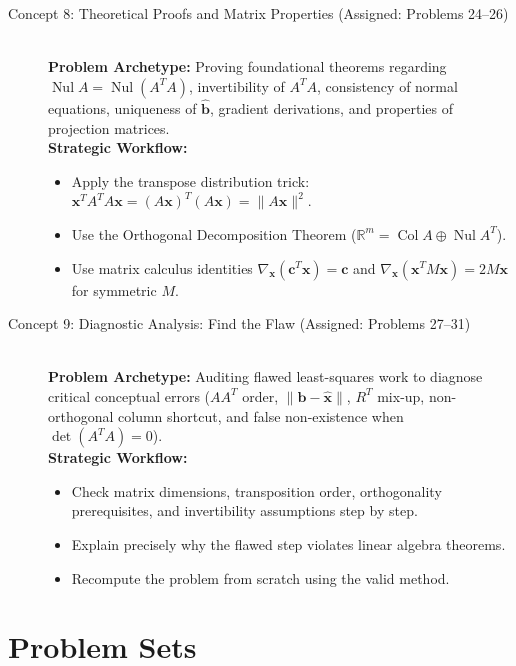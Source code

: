 \documentclass[11pt, letterpaper]{article}
\theoremstyle{definition}
\theoremstyle{remark}
\begin{document}
\begin{description}
    \item[Concept 8: Theoretical Proofs and Matrix Properties (Assigned: Problems 24--26)] \hfill \\
    \textbf{Problem Archetype:} Proving foundational theorems regarding $\operatorname{Nul} A = \operatorname{Nul}(A^T A)$, invertibility of $A^T A$, consistency of normal equations, uniqueness of $\hat{\mathbf{b}}$, gradient derivations, and properties of projection matrices.\\
    \textbf{Strategic Workflow:}
    \begin{itemize}
        \item Apply the transpose distribution trick: $\mathbf{x}^T A^T A \mathbf{x} = (A\mathbf{x})^T(A\mathbf{x}) = \|A\mathbf{x}\|^2$.
        \item Use the Orthogonal Decomposition Theorem ($\mathbb{R}^m = \operatorname{Col} A \oplus \operatorname{Nul} A^T$).
        \item Use matrix calculus identities $\nabla_{\mathbf{x}}(\mathbf{c}^T \mathbf{x}) = \mathbf{c}$ and $\nabla_{\mathbf{x}}(\mathbf{x}^T M \mathbf{x}) = 2M\mathbf{x}$ for symmetric $M$.
    \end{itemize}

    \item[Concept 9: Diagnostic Analysis: Find the Flaw (Assigned: Problems 27--31)] \hfill \\
    \textbf{Problem Archetype:} Auditing flawed least-squares work to diagnose critical conceptual errors ($AA^T$ order, $\|\mathbf{b}-\hat{\mathbf{x}}\|$, $R^T$ mix-up, non-orthogonal column shortcut, and false non-existence when $\det(A^T A)=0$).\\
    \textbf{Strategic Workflow:}
    \begin{itemize}
        \item Check matrix dimensions, transposition order, orthogonality prerequisites, and invertibility assumptions step by step.
        \item Explain precisely why the flawed step violates linear algebra theorems.
        \item Recompute the problem from scratch using the valid method.
    \end{itemize}
\end{description}

\newpage

\section{Problem Sets}
\end{document}
